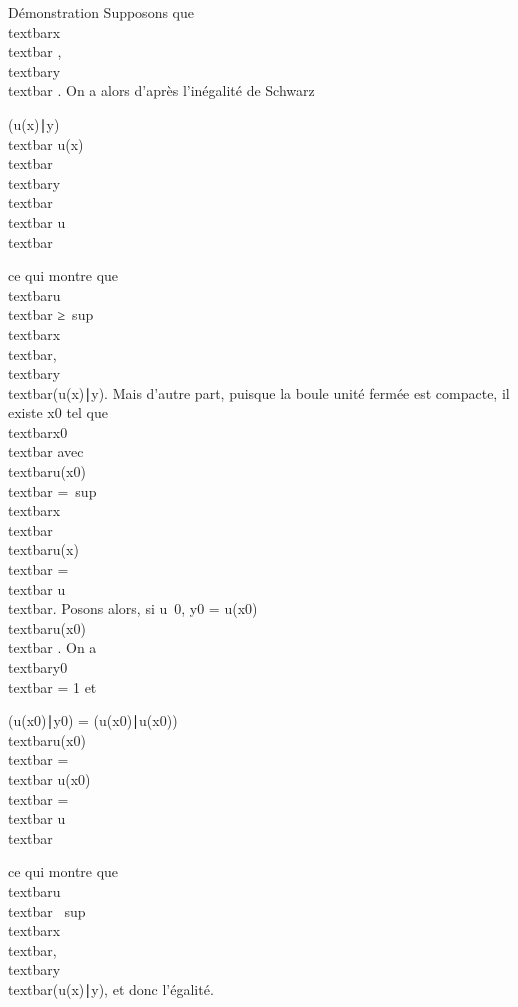 Démonstration Supposons que
\\textbar{}x\\textbar{} ,\\textbar{}y\\textbar{} . On a alors
d'après l'inégalité de Schwarz

\textbar{}(u(x)∣y)\textbar{}\leq\\textbar{}
u(x)\\textbar{}\\textbar{}y\\textbar{}
\leq\\textbar{} u\\textbar{}

ce qui montre que \\textbar{}u\\textbar{}
≥\
sup\\textbar{}x\\textbar{},\\textbar{}y\\textbar{}\textbar{}(u(x)∣y)\textbar{}.
Mais d'autre part, puisque la boule unité fermée est compacte, il existe
x0 tel que
\\textbar{}x0\\textbar{} 
avec \\textbar{}u(x0)\\textbar{}
=\
sup\\textbar{}x\\textbar{}\\textbar{}u(x)\\textbar{}
=\\textbar{} u\\textbar{}. Posons alors,
si u\neq~0, y0 = u(x0)
\over
\\textbar{}u(x0)\\textbar{} .
On a \\textbar{}y0\\textbar{} =
1 et

\textbar{}(u(x0)∣y0)\textbar{}
= (u(x0)∣u(x0))
\over
\\textbar{}u(x0)\\textbar{}
=\\textbar{} u(x0)\\textbar{}
=\\textbar{} u\\textbar{}

ce qui montre que \\textbar{}u\\textbar{}
\leq\
sup\\textbar{}x\\textbar{},\\textbar{}y\\textbar{}\textbar{}(u(x)∣y)\textbar{},
et donc l'égalité.

